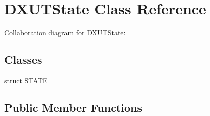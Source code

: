 \hypertarget{class_d_x_u_t_state}{\section{D\+X\+U\+T\+State Class Reference}
\label{class_d_x_u_t_state}
}


Collaboration diagram for D\+X\+U\+T\+State\+:
\subsection*{Classes}
\begin{DoxyCompactItemize}
\item 
struct \hyperlink{struct_d_x_u_t_state_1_1_s_t_a_t_e}{S\+T\+A\+T\+E}
\end{DoxyCompactItemize}
\subsection*{Public Member Functions}
